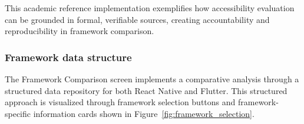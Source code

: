 This academic reference implementation exemplifies how accessibility evaluation can be grounded in formal, verifiable sources, creating accountability and reproducibility in framework comparison.

\subsubsection{Framework data structure}

The Framework Comparison screen implements a comparative analysis through a structured data repository for both React Native and Flutter. This structured approach is visualized through framework selection buttons and framework-specific information cards shown in Figure~\ref{fig:framework_selection}.

\begin{figure}[ht]
    \centering
    \begin{subfigure}[b]{0.48\textwidth}
        \centering

\end{subfigure}
\end{figure}
